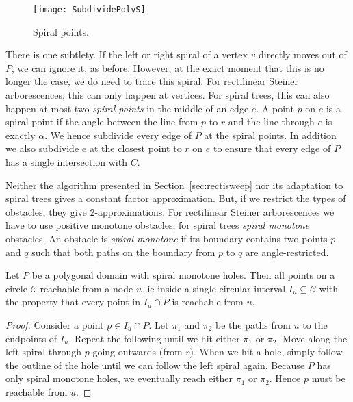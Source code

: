 \documentclass{journalA4}
\begin{document}
\begin{wrapfigure}[8]{r}{.27\textwidth}
  \centering
  \texttt{[image: SubdividePolyS]}
  \small{\caption{Spiral points.\label{fig:SubdividePoly}}}
\end{wrapfigure}

There is one subtlety. If the left or right spiral of a vertex $v$ directly moves out of $P$, we can ignore it, as before. However, at the exact moment that this is no longer the case, we do need to trace this spiral. For rectilinear Steiner arborescences, this can only happen at vertices. For spiral trees, this can also happen at most two \emph{spiral points} in the middle of an edge $e$. A point $p$ on $e$ is a spiral point if the angle between the line from $p$ to $r$ and the line through $e$ is exactly $\alpha$. We hence subdivide every edge of $P$ at the spiral points. In addition we also subdivide $e$ at the closest point to $r$ on $e$ to ensure that every edge of $P$ has a single intersection with $C$.

Neither the algorithm presented in Section~\ref{sec:rectisweep} nor its adaptation to spiral trees gives a constant factor approximation. But, if we restrict the types of obstacles, they give 2-approximations. For rectilinear Steiner arborescences we have to use positive monotone obstacles, for spiral trees \emph{spiral monotone} obstacles. An obstacle is \emph{spiral monotone} if its boundary contains two points $p$ and $q$ such that both paths on the boundary from $p$ to $q$ are angle-restricted.


\begin{lemma}\label{lem:spiralmonotone}
Let $P$ be a polygonal domain with spiral monotone holes. Then all points on a circle $\mathcal{C}$ reachable from a node $u$ lie inside a single circular interval $I_u \subseteq \mathcal{C}$ with the property that every point in $I_u \cap P$ is reachable from $u$.
\end{lemma}
\begin{proof}
Consider a point $p \in I_u \cap P$. Let $\pi_1$ and $\pi_2$ be the paths from $u$ to the endpoints of $I_u$. Repeat the following until we hit either $\pi_1$ or $\pi_2$. Move along the left spiral through $p$ going outwards (from $r$). When we hit a hole, simply follow the outline of the hole until we can follow the left spiral again. Because $P$ has only spiral monotone holes, we eventually reach either $\pi_1$ or $\pi_2$. Hence $p$ must be reachable from $u$.
\end{proof}
\end{document}
